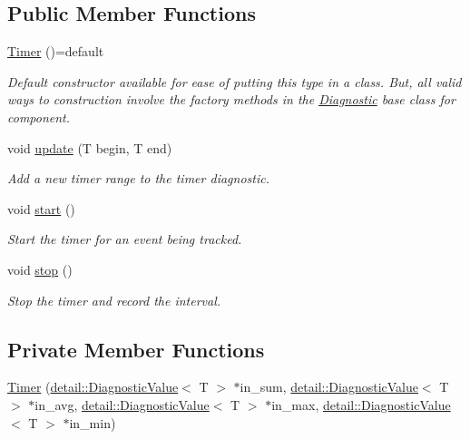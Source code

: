 \subsection*{Public Member Functions}
\begin{DoxyCompactItemize}
\item 
\hyperlink{structvt_1_1runtime_1_1component_1_1meter_1_1_timer_af32ee3397a43cd6af675904d70295211}{Timer} ()=default
\begin{DoxyCompactList}\small\item\em Default constructor available for ease of putting this type in a class. But, all valid ways to construction involve the factory methods in the {\ttfamily \hyperlink{structvt_1_1runtime_1_1component_1_1_diagnostic}{Diagnostic}} base class for component. \end{DoxyCompactList}\item 
void \hyperlink{structvt_1_1runtime_1_1component_1_1meter_1_1_timer_a04aed118756cd5e95ce1f264978effc2}{update} (T begin, T end)
\begin{DoxyCompactList}\small\item\em Add a new timer range to the timer diagnostic. \end{DoxyCompactList}\item 
void \hyperlink{structvt_1_1runtime_1_1component_1_1meter_1_1_timer_a685bd06e9e97de01cf8948dec7d59462}{start} ()
\begin{DoxyCompactList}\small\item\em Start the timer for an event being tracked. \end{DoxyCompactList}\item 
void \hyperlink{structvt_1_1runtime_1_1component_1_1meter_1_1_timer_a302a9e413a1188b3a30ece1905123249}{stop} ()
\begin{DoxyCompactList}\small\item\em Stop the timer and record the interval. \end{DoxyCompactList}\end{DoxyCompactItemize}
\subsection*{Private Member Functions}
\begin{DoxyCompactItemize}
\item 
\hyperlink{structvt_1_1runtime_1_1component_1_1meter_1_1_timer_afc814a211d7354cad6e64783e1f8fe8a}{Timer} (\hyperlink{structvt_1_1runtime_1_1component_1_1detail_1_1_diagnostic_value}{detail\+::\+Diagnostic\+Value}$<$ T $>$ $\ast$in\+\_\+sum, \hyperlink{structvt_1_1runtime_1_1component_1_1detail_1_1_diagnostic_value}{detail\+::\+Diagnostic\+Value}$<$ T $>$ $\ast$in\+\_\+avg, \hyperlink{structvt_1_1runtime_1_1component_1_1detail_1_1_diagnostic_value}{detail\+::\+Diagnostic\+Value}$<$ T $>$ $\ast$in\+\_\+max, \hyperlink{structvt_1_1runtime_1_1component_1_1detail_1_1_diagnostic_value}{detail\+::\+Diagnostic\+Value}$<$ T $>$ $\ast$in\+\_\+min)
\end{DoxyCompactItemize}
